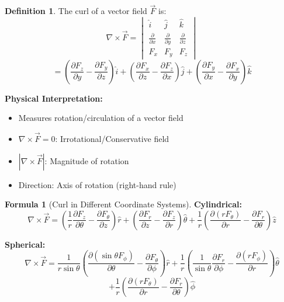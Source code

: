 \documentclass[12pt,a4paper]{article}
\theoremstyle{definition}
\newtheorem{definition}[theorem]{Definition}
\newtheorem{formula}[theorem]{Formula}
\begin{document}
\begin{definition}
The curl of a vector field $\vec{F}$ is:
\[
\nabla \times \vec{F} = \begin{vmatrix}
\hat{i} & \hat{j} & \hat{k} \\
\frac{\partial}{\partial x} & \frac{\partial}{\partial y} & \frac{\partial}{\partial z} \\
F_x & F_y & F_z
\end{vmatrix}
\]
\[
= \left(\frac{\partial F_z}{\partial y} - \frac{\partial F_y}{\partial z}\right)\hat{i} + \left(\frac{\partial F_x}{\partial z} - \frac{\partial F_z}{\partial x}\right)\hat{j} + \left(\frac{\partial F_y}{\partial x} - \frac{\partial F_x}{\partial y}\right)\hat{k}
\]
\end{definition}

\begin{importantbox}
\textbf{Physical Interpretation:}
\begin{itemize}
    \item Measures rotation/circulation of a vector field
    \item $\nabla \times \vec{F} = 0$: Irrotational/Conservative field
    \item $|\nabla \times \vec{F}|$: Magnitude of rotation
    \item Direction: Axis of rotation (right-hand rule)
\end{itemize}
\end{importantbox}

\begin{formula}[Curl in Different Coordinate Systems]
\textbf{Cylindrical:}
\[
\nabla \times \vec{F} = \left(\frac{1}{r}\frac{\partial F_z}{\partial\theta} - \frac{\partial F_\theta}{\partial z}\right)\hat{r} + \left(\frac{\partial F_r}{\partial z} - \frac{\partial F_z}{\partial r}\right)\hat{\theta} + \frac{1}{r}\left(\frac{\partial(rF_\theta)}{\partial r} - \frac{\partial F_r}{\partial\theta}\right)\hat{z}
\]

\textbf{Spherical:}
\[
\nabla \times \vec{F} = \frac{1}{r\sin\theta}\left(\frac{\partial(\sin\theta F_\phi)}{\partial\theta} - \frac{\partial F_\theta}{\partial\phi}\right)\hat{r} + \frac{1}{r}\left(\frac{1}{\sin\theta}\frac{\partial F_r}{\partial\phi} - \frac{\partial(rF_\phi)}{\partial r}\right)\hat{\theta}
\]
\[
+ \frac{1}{r}\left(\frac{\partial(rF_\theta)}{\partial r} - \frac{\partial F_r}{\partial\theta}\right)\hat{\phi}
\]
\end{formula}
\end{document}
